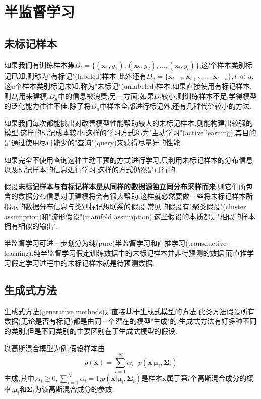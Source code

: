 \chapter{半监督学习}

\section{未标记样本}

如果我们有训练样本集$D_l=\{(\mathbf x_1, y_1),(\mathbf x_2, y_2),\dots,(\mathbf x_l, y_l)\}$,这$l$个样本类别标记已知,则称为"有标记"(labeled)样本;此外还有$D_u=\{\mathbf x_{l+1}, \mathbf x_{l+2}, \dots, \mathbf x_{l+u}\},l\ll u$,这$u$个样本类别标记未知,称为"未标记"(unlabeled)样本.如果直接使用有标记样本,则$D_l$用来建模,$D_u$中的信息被浪费;另一方面,如果$D_l$较小,则训练样本不足,学得模型的泛化能力往往不佳.除了将$D_u$中样本全部进行标记外,还有几种代价较小的方法.

如果我们每次都能挑出对改善模型性能帮助较大的未标记样本,则能构建出较强的模型.这样的标记成本较小.这样的学习方式称为"主动学习"(active learning),其目的是通过使用尽可能少的"查询"(query)来获得尽量好的性能.

如果完全不使用查询这种主动干预的方式进行学习,只利用未标记样本的分布信息以及标记样本的信息进行学习,这样的方式仍然是可行的.

假设\textbf{未标记样本与有标记样本是从同样的数据源独立同分布采样而来},则它们所包含的数据分布信息对于建模将会有很大帮助.这样就必然要做一些将未标记样本所揭示的数据分布信息与类别标记想联系的假设.常见的假设有"聚类假设"(cluster assumption)和"流形假设"(manifold assumption),这些假设的本质都是"相似的样本拥有相似的输出".

半监督学习可进一步划分为纯(pure)半监督学习和直推学习(transductive learning).纯半监督学习假定训练数据中的未标记样本并非待预测的数据,而直推学习假定学习过程中的未标记样本就是待预测数据.

\section{生成式方法}

生成式方法(generative methods)是直接基于生成式模型的方法.此类方法假设所有数据(无论是否有标记)都是由同一个潜在的模型"生成"的.生成式方法有好多种不同的类别,但是不同类别的主要区别在于生成式模型的假设.

以高斯混合模型为例,假设样本由
\begin{equation}
p(\mathbf x)=\sum_{i=1}^N\alpha_i\cdot p(\mathbf x|\mathbf\mu_i,\mathbf\Sigma_i)
\end{equation}
生成,其中,$\alpha_i\ge 0,\sum_{i=1}^N\alpha_i=1$;$p(\mathbf x|\mathbf\mu_i,\mathbf\Sigma_i)$是样本$\mathbf x$属于第$i$个高斯混合成分的概率;$\mathbf\mu_i$和$\mathbf\Sigma_i$为该高斯混合成分的参数.

